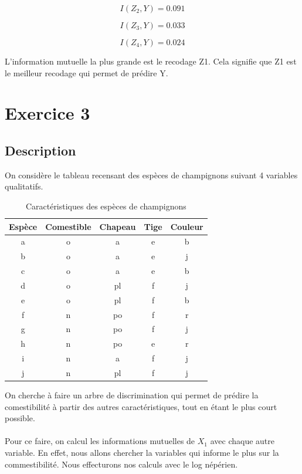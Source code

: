 \documentclass{article}
\begin{document}
\[
I(Z_2,Y) = 0.091
\]

\[
I(Z_3,Y) = 0.033
\]

\[
I(Z_4,Y) = 0.024
\]

L'information mutuelle la plus grande est le recodage Z1.
Cela signifie que Z1 est le meilleur recodage qui permet de prédire Y.


\newpage
\section{Exercice 3}
\subsection{Description}

On considère le tableau recensant des espèces de champignons suivant 4 variables qualitatifs. 

\begin{table}[h]
  \centering
  \caption{Caractéristiques des espèces de champignons}
  \begin{tabular}{@{}ccccc@{}}
  \toprule
  Espèce & Comestible & Chapeau & Tige & Couleur \\ \midrule
  a      & o          & a       & e    & b       \\
  b      & o          & a       & e    & j       \\
  c      & o          & a       & e    & b       \\
  d      & o          & pl      & f    & j       \\
  e      & o          & pl      & f    & b       \\
  f      & n          & po      & f    & r       \\
  g      & n          & po      & f    & j       \\
  h      & n          & po      & e    & r       \\
  i      & n          & a       & f    & j       \\
  j      & n          & pl      & f    & j       \\ \bottomrule
  \end{tabular}
  
  \label{tab:champignons}
  \end{table}

  On cherche à faire un arbre de discrimination qui permet de prédire la comestibilité à partir des autres caractéristiques, tout en étant le plus court possible.
  \\
  \\
  Pour ce faire, on calcul les informations mutuelles de $X_1$ avec chaque autre variable.
  En effet, nous allons chercher la variables qui informe le plus sur la commestibilité. Nous effecturons nos calculs avec le log népérien.
\end{document}
